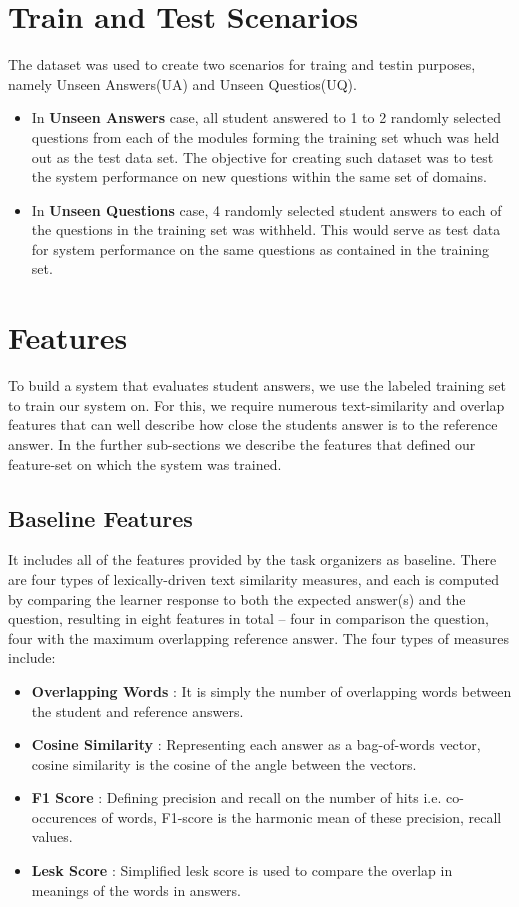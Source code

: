 \documentclass[a4paper]{article}
\begin{document}
\section{Train and Test Scenarios}
The dataset was used to create two scenarios for traing and testin purposes, namely Unseen Answers(UA) and Unseen Questios(UQ). 
\begin{itemize}
	\item In \textbf{Unseen Answers} case,
all student answered to 1 to 2 randomly selected questions from each of the modules forming the training set whuch was held out as the test data set.
The objective for creating such dataset was to test the system performance on new questions within the same set of domains.
\item In \textbf{Unseen Questions} case, 4 randomly selected student answers to each of the questions in the training set was withheld. This would serve as test data for system performance on the 
same questions as contained in the training set. 
\end{itemize} 
 
\section{Features}
To build a system that evaluates student answers, we use the labeled training set to train our system on. For this, we require numerous text-similarity and overlap features that can well describe how close the students answer is to the reference answer. In the further sub-sections we describe the features that defined our feature-set on which the system was trained.
\subsection{Baseline Features}
It includes all of the features provided by the task organizers as baseline. There are four types of lexically-driven text similarity measures, and each is computed by comparing the learner response to both the expected answer(s) and the question, resulting in eight features in total -- four in comparison the question, four with the maximum overlapping reference answer. The four types of measures include:
\begin{itemize}
	\item \textbf{Overlapping Words} : It is simply the number of overlapping words between the student and reference answers.
	\item \textbf{Cosine Similarity} : Representing each answer as a bag-of-words vector, cosine similarity is the cosine of the angle between the vectors.
	\item \textbf{F1 Score} : Defining precision and recall on the number of hits i.e. co-occurences of words, F1-score is the harmonic mean of these precision, recall values.
	\item \textbf{Lesk Score} : Simplified lesk score is used to compare the overlap in meanings of the words in answers. \cite{banerjee}
\end{itemize}
\end{document}
